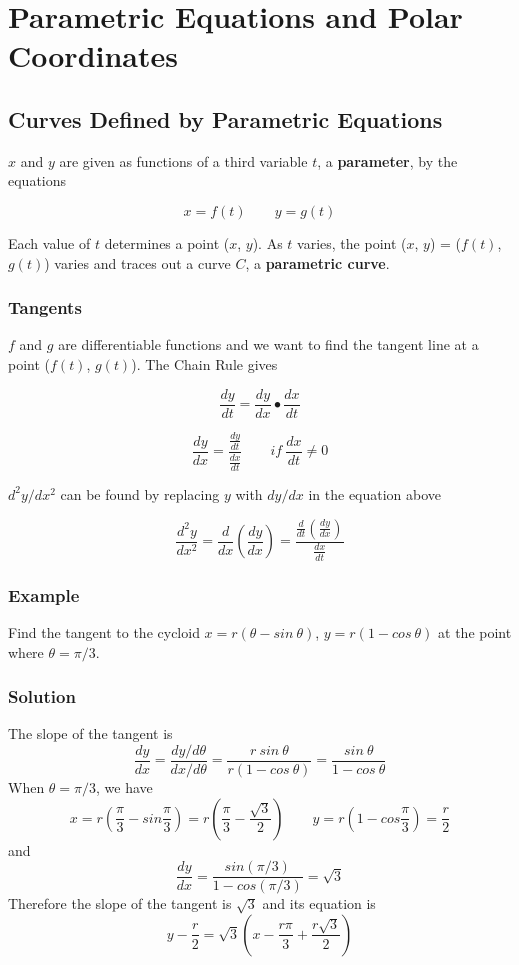 \setcounter{chapter}{10}
\chapter{Parametric Equations and Polar Coordinates}

\section{Curves Defined by Parametric Equations}
$x$ and $y$ are given as functions of a third variable $t$,
a \textbf{parameter}, by the equations

$$ x = f(t) \qquad y = g(t) $$

Each value of $t$ determines a point ($x$, $y$).
As $t$ varies, the point ($x$, $y$) = ($f(t)$, $g(t)$)
varies and traces out a curve $C$, a \textbf{parametric curve}.

\subsection*{Tangents}
$f$ and $g$ are differentiable functions and we want to find the
tangent line at a point ($f(t)$, $g(t)$). The Chain Rule gives

$$ \frac{dy}{dt} = \frac{dy}{dx} \bullet \frac{dx}{dt} $$

$$ \frac{dy}{dx} = \frac{\frac{dy}{dt}}{\frac{dx}{dt}} \qquad if \: \frac{dx}{dt} \neq 0$$

$d^2y/dx^2$ can be found by replacing $y$ with $dy/dx$ in the equation above

$$ \frac{d^2y}{dx^2} = \frac{d}{dx}\left(\frac{dy}{dx}\right) = \frac{\frac{d}{dt}(\frac{dy}{dx})}{\frac{dx}{dt}} $$

\subsection*{Example}
Find the tangent to the cycloid $x=r(\theta - sin\: \theta)$, $y=r(1-cos\: \theta)$
at the point where $\theta=\pi/3$.

\subsection*{Solution}
The slope of the tangent is
$$\frac{dy}{dx}=\frac{dy/d\theta}{dx/d\theta}=\frac{r\: sin\: \theta}{r(1-cos\: \theta)}
    =\frac{sin\: \theta}{1-cos\: \theta}$$
When $\theta=\pi /3$, we have
$$x=r\left(\frac{\pi}{3}-sin\frac{\pi}{3}\right)=r\left(\frac{\pi}{3}-\frac{\sqrt{3}}{2}\right)
    \qquad y=r\left(1-cos\frac{\pi}{3}\right)=\frac{r}{2}$$
and
$$\frac{dy}{dx}=\frac{sin(\pi/3)}{1-cos(\pi/3)}=\sqrt{3}$$
Therefore the slope of the tangent is $\sqrt{3}$ and its equation is
$$y-\frac{r}{2}=\sqrt{3}\left(x-\frac{r\pi}{3}+\frac{r\sqrt{3}}{2}\right)$$


